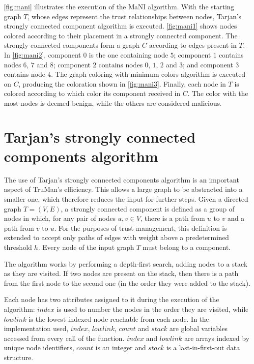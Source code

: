 \autoref{fig:mani} illustrates the execution of the MaNI algorithm.
With the starting graph $T$, whose edges represent the trust relationships between nodes, Tarjan's strongly connected component algorithm is executed.
\autoref{fig:mani1} shows nodes colored according to their placement in a strongly connected component.
The strongly connected components form a graph $C$ according to edges present in $T$.
In \autoref{fig:mani2}, component $0$ is the one containing node $5$; component $1$ contains nodes $6$, $7$ and $8$; component $2$ contains nodes $0$, $1$, $2$ and $3$; and component $3$ contains node $4$.
The graph coloring with minimum colors algorithm is executed on $C$, producing the coloration shown in \autoref{fig:mani3}.
Finally, each node in $T$ is colored according to which color its component received in $C$.
The color with the most nodes is deemed benign, while the others are considered malicious. 


%
%
%
%

\section{Tarjan's strongly connected components algorithm}
\label{section:tarjan}
The use of Tarjan's strongly connected components algorithm \cite{tarjan1972depth} is an important aspect of TruMan's efficiency.
This allows a large graph to be abstracted into a smaller one, which therefore reduces the input for further steps.
Given a directed graph $T = (V,E)$, a strongly connected component is defined as a group of nodes in which, for any pair of nodes $u, v \in V$, there is a path from $u$ to $v$ and a path from $v$ to $u$.
For the purposes of trust management, this definition is extended to accept only paths of edges with weight above a predetermined threshold $h$.
Every node of the input graph $T$ must belong to a component.

The algorithm works by performing a depth-first search, adding nodes to a stack as they are visited.
If two nodes are present on the stack, then there is a path from the first node to the second one (in the order they were added to the stack).

Each node has two attributes assigned to it during the execution of the algorithm: $index$ is used to number the nodes in the order they are visited, while $lowlink$ is the lowest indexed node reachable from each node.
In the implementation used, $index$, $lowlink$, $count$ and $stack$ are global variables accessed from every call of the function.
$index$ and $lowlink$ are arrays indexed by unique node identifiers, $count$ is an integer and $stack$ is a last-in-first-out data structure.

